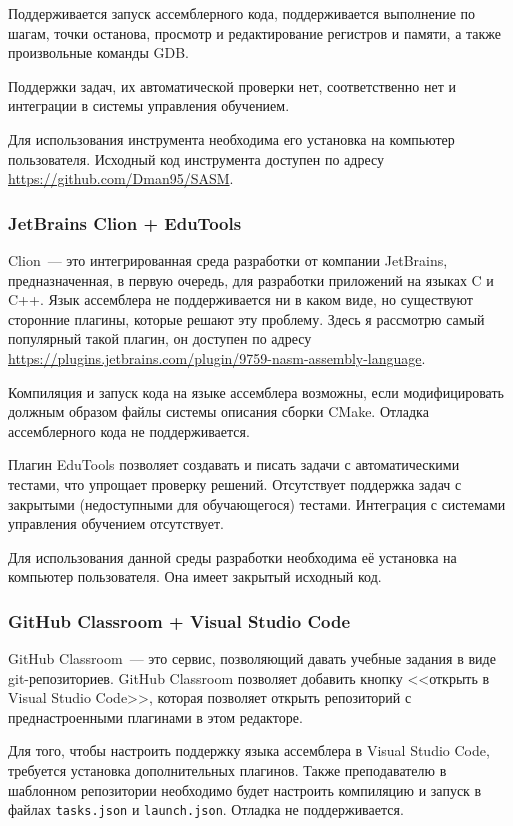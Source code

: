 \documentclass[a4paper,article,14pt]{extarticle}
\begin{document}
Поддерживается запуск ассемблерного кода, поддерживается выполнение по шагам, точки останова, просмотр и редактирование регистров и памяти, а также произвольные команды GDB.

Поддержки задач, их автоматической проверки нет, соответственно нет и интеграции в системы управления обучением.

Для использования инструмента необходима его установка на компьютер пользователя. Исходный код инструмента доступен по адресу \url{https://github.com/Dman95/SASM}.

\subsubsection{JetBrains Clion + EduTools}

Clion~--- это интегрированная среда разработки от компании JetBrains, предназначенная, в первую очередь, для разработки приложений на языках C и C++. Язык ассемблера не поддерживается ни в каком виде, но существуют сторонние плагины, которые решают эту проблему. Здесь я рассмотрю самый популярный такой плагин, он доступен по адресу \url{https://plugins.jetbrains.com/plugin/9759-nasm-assembly-language}.

Компиляция и запуск кода на языке ассемблера возможны, если модифицировать должным образом файлы системы описания сборки CMake. Отладка ассемблерного кода не поддерживается.

Плагин EduTools позволяет создавать и писать задачи с автоматическими тестами, что упрощает проверку решений. Отсутствует поддержка задач с закрытыми (недоступными для обучающегося) тестами. Интеграция с системами управления обучением отсутствует.

Для использования данной среды разработки необходима её установка на компьютер пользователя. Она имеет закрытый исходный код.

\subsubsection{GitHub Classroom + Visual Studio Code}

GitHub Classroom~--- это сервис, позволяющий давать учебные задания в виде git-репозиториев. GitHub Classroom позволяет добавить кнопку <<открыть в Visual Studio Code>>, которая позволяет открыть репозиторий с преднастроенными плагинами в этом редакторе.

Для того, чтобы настроить поддержку языка ассемблера в Visual Studio Code, требуется установка дополнительных плагинов. Также преподавателю в шаблонном репозитории необходимо будет настроить компиляцию и запуск в файлах \texttt{tasks.json} и \texttt{launch.json}. Отладка не поддерживается.
\end{document}
